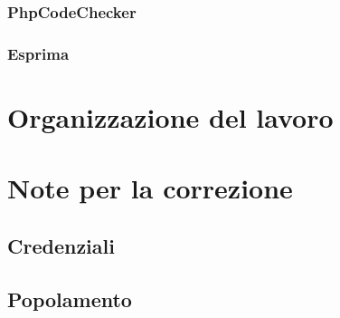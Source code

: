 \documentclass[a4paper, oneside, openany, dvipsnames, table]{article}
\begin{document}
		\subsubsection{PhpCodeChecker}
			
		\subsubsection{Esprima}
			
			
\newpage
\section{Organizzazione del lavoro}
	
	
\appendix
{}
\newpage
\section{Note per la correzione}
	
	\subsection{Credenziali}
		
	\subsection{Popolamento}
		

\newpage
\end{document}

